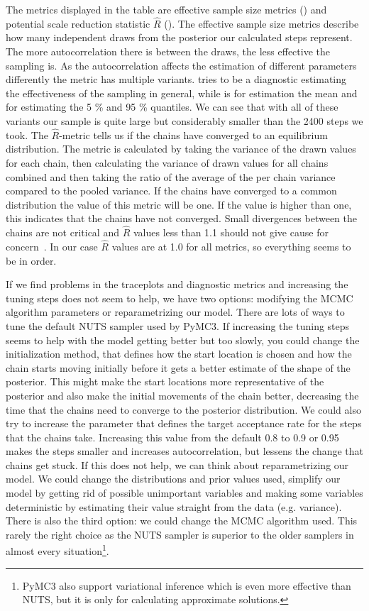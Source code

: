 \documentclass[12pt,a4paper,leqno]{report}
\theoremstyle{plain}
\theoremstyle{definition}
\theoremstyle{remark}
\begin{document}
The metrics displayed in the table are effective sample size metrics ()
and potential scale reduction statistic \(\hat{R}\) (). The effective sample
size metrics describe how many independent draws from the posterior our calculated steps
represent. The more autocorrelation there is between the draws, the less effective the
sampling is. As the autocorrelation affects the estimation of different parameters
differently the metric has multiple variants.  tries to be a
diagnostic estimating the effectiveness of the sampling in general\cite{essbulk},
while  is for estimation the mean and
 for estimating the 5 \% and 95 \% quantiles. We can see that with all
of these variants our sample is quite large but considerably smaller than the 2400
steps we took. The \(\hat{R}\)-metric
tells us if the chains have converged to an equilibrium distribution. The metric is calculated by
taking the variance of the drawn values for each chain,
then calculating the variance of drawn values for all chains combined and then taking the
ratio of the average of the per chain variance compared to the pooled variance. If the
chains have converged to a common distribution the value of this metric will be one. If
the value is higher than one, this indicates that the chains have not converged. Small
divergences between the chains are not critical and \(\hat{R}\) values less than 1.1 should
not give cause for concern\ \cite{rhatrule}. In our case \(\hat{R}\) values are at 1.0 for
all metrics, so everything seems to be in order.

If we find problems in the traceplots and diagnostic metrics and increasing the tuning
steps does not seem to help, we have two options: modifying the MCMC algorithm
parameters or reparametrizing our model. There are lots of ways to tune the
default NUTS sampler used by PyMC3. If increasing the tuning steps seems to help with
the model getting better but too slowly, you could change the initialization method, that
defines how the start location is chosen and how
the chain starts moving initially before it gets a better estimate of the shape of the
posterior. This might make the start locations more representative of the posterior and
also make the initial movements of the chain better, decreasing the time that the chains
need to converge to the posterior distribution. We could also try to increase the
parameter  that defines the target acceptance rate for the steps
that the chains take. Increasing this value from the default 0.8 to 0.9 or 0.95 makes the
steps smaller and increases autocorrelation, but lessens the change that chains get
stuck. If this does not help, we
can think about reparametrizing our model. We could change the distributions and prior
values used, simplify our model by getting rid of possible unimportant variables and making
some variables deterministic by estimating their value straight from the data (e.g.
variance). There is also the third option: we could change the MCMC algorithm used. This
rarely the right choice as the NUTS sampler is superior to the older samplers in almost
every situation\footnote{PyMC3 also support variational
inference which is even more effective than NUTS, but it is only for calculating approximate
solutions.}.
\end{document}
